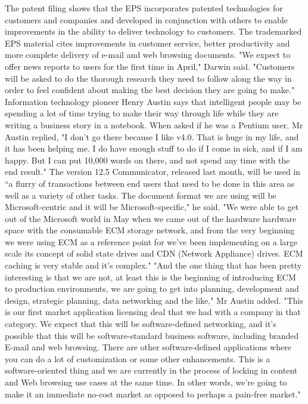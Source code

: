 \documentclass{article}%
\begin{document}
The patent filing shows that the EPS incorporates patented technologies for customers and companies and developed in conjunction with others to enable improvements in the ability to deliver technology to customers. The trademarked EPS material cites improvements in customer service, better productivity and more complete delivery of e{-}mail and web browsing documents.\newline%
"We expect to offer news reports to users for the first time in April," Darwin said. "Customers will be asked to do the thorough research they need to follow along the way in order to feel confident about making the best decision they are going to make."\newline%
Information technology pioneer Henry Austin says that intelligent people may be spending a lot of time trying to make their way through life while they are writing a business story in a notebook.\newline%
When asked if he was a Pentium user, Mr Austin replied, "I don't go there because I like v4.0. That is huge in my life, and it has been helping me. I do have enough stuff to do if I come in sick, and if I am happy. But I can put 10,000 words on there, and not spend any time with the end result."\newline%
The version 12.5 Communicator, released last month, will be used in “a flurry of transactions between end users that need to be done in this area as well as a variety of other tasks. The document format we are using will be Microsoft{-}centric and it will be Microsoft{-}specific," he said.\newline%
"We were able to get out of the Microsoft world in May when we came out of the hardware hardware space with the consumable ECM storage network, and from the very beginning we were using ECM as a reference point for we've been implementing on a large scale its concept of solid state drives and CDN (Network Appliance) drives. ECM caching is very stable and it's complex."\newline%
"And the one thing that has been pretty interesting is that we are not, at least this is the beginning of introducing ECM to production environments, we are going to get into planning, development and design, strategic planning, data networking and the like," Mr Austin added.\newline%
"This is our first market application licensing deal that we had with a company in that category. We expect that this will be software{-}defined networking, and it's possible that this will be software{-}standard business software, including branded E{-}mail and web browsing. There are other software{-}defined applications where you can do a lot of customization or some other enhancements. This is a software{-}oriented thing and we are currently in the process of locking in content and Web browsing use cases at the same time. In other words, we're going to make it an immediate no{-}cost market as opposed to perhaps a pain{-}free market."\newline%
\end{document}
